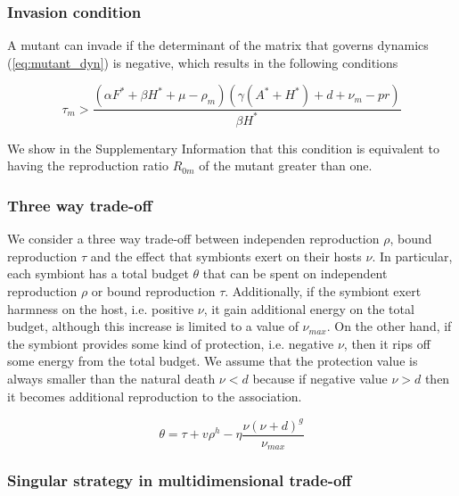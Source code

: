 \documentclass[11pt]{article}
\begin{document}
\subsubsection*{Invasion condition}
A mutant can invade if the determinant of the matrix that governs dynamics (\ref{eq:mutant_dyn}) is negative, which results in the following conditions

\begin{equation}
	\tau_m > \frac{(\alpha  F^* + \beta  H^* + \mu  - \rho_m) (\gamma  (A^* + H^*) + d + \nu_m - p r)}{\beta  H^*}
	\label{eq:invasion}
\end{equation}

We show in the Supplementary Information that this condition is equivalent to having the reproduction ratio $R_{0m}$ of the mutant greater than one.

\subsubsection*{Three way trade-off}
We consider a three way trade-off between independen reproduction $\rho$, bound reproduction $\tau$ and the effect that symbionts exert on their hosts $\nu$. In particular, each symbiont has a total budget $\theta$ that can be spent on independent reproduction $\rho$ or bound reproduction $\tau$. Additionally, if the symbiont exert harmness on the host, i.e. positive $\nu$, it gain additional energy on the total budget, although this increase is limited to a value of $\nu_{max}$. On the other hand, if the symbiont provides some kind of protection, i.e. negative $\nu$, then it rips off some energy from the total budget. We assume that the protection value is always smaller than the natural death $\nu < d$ because if negative value $\nu > d$ then it becomes additional reproduction to the association. 

\begin{equation}
	\theta = \tau + v \rho^h -  \eta \frac{\nu (\nu + d)^g}{\nu_{max}}
	\label{eq:tradeoff}
\end{equation}

\subsubsection*{Singular strategy in multidimensional trade-off}
\end{document}
